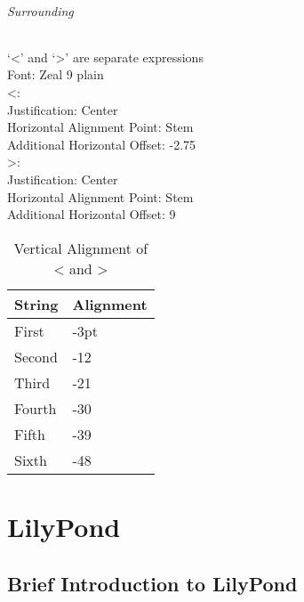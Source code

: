 \documentclass[]{memoir}
\begin{document}
\paragraph{Surrounding}
\label{sec:surrounding}

`<' and `>' are separate expressions\\
Font: Zeal 9 plain\\

<:\\
\indent Justification: Center\\
\indent Horizontal Alignment Point: Stem\\
\indent Additional Horizontal Offset: -2.75\\

>:\\
\indent Justification: Center\\
\indent Horizontal Alignment Point: Stem\\
\indent Additional Horizontal Offset: 9\\

\begin{table}[h!]
  \centering
  \begin{tabular}{l l}
    String & Alignment\\\hline
    First & -3pt\\
    Second & -12\\
    Third & -21\\
    Fourth & -30\\
    Fifth & -39\\
    Sixth & -48\\
  \end{tabular}
  \caption{Vertical Alignment of < and >}
\end{table}

\part{LilyPond}
\label{part:lilypond}

\chapter{Brief Introduction to LilyPond}
\label{cha:brief-intr-lilyp}
\end{document}

